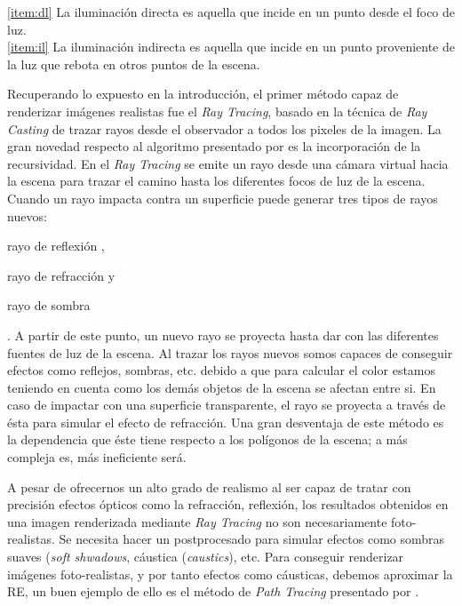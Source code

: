 \documentclass[titlepage,12pt]{article}
\begin{document}
\ref{item:dl} La iluminación directa es aquella que incide en un punto desde el foco de luz. \\
\ref{item:il} La iluminación indirecta es aquella que incide en un punto proveniente de la luz que rebota en otros puntos de la escena.

Recuperando lo expuesto en la introducción, el primer método capaz de renderizar imágenes realistas fue el \textit{Ray Tracing}, basado en la técnica de \textit{Ray Casting} de trazar rayos desde el observador a todos los pixeles de la imagen. La gran novedad respecto al algoritmo presentado por \citep{Appel1968} es la incorporación de la recursividad. En el \textit{Ray Tracing} se emite un rayo desde una cámara virtual hacia la escena para trazar el camino hasta los diferentes focos de luz de la escena. Cuando un rayo impacta contra un superficie puede generar tres tipos de rayos nuevos: \begin{enumerate*}[label=\roman*)] \item rayo de reflexión \label{ray:reflected}, \item rayo de refracción y \item rayo de sombra \end{enumerate*}. A partir de este punto, un nuevo rayo se proyecta hasta dar con las diferentes fuentes de luz de la escena. Al trazar los rayos nuevos somos capaces de conseguir efectos como reflejos, sombras, etc. debido a que para calcular el color estamos teniendo en cuenta como los demás objetos de la escena se afectan entre si. En caso de impactar con una superficie transparente, el rayo se proyecta a través de ésta para simular el efecto de refracción. Una gran desventaja de este método es la dependencia que éste tiene respecto a los polígonos de la escena; a más compleja es, más ineficiente será. 

A pesar de ofrecernos un alto grado de realismo al ser capaz de tratar con precisión efectos ópticos como la refracción, reflexión, los resultados obtenidos en una imagen renderizada mediante \textit{Ray Tracing} no son necesariamente foto-realistas. Se necesita hacer un postprocesado para simular efectos como sombras suaves (\textit{soft shwadows}, cáustica (\textit{caustics}), etc. Para conseguir renderizar imágenes foto-realistas, y por tanto efectos como cáusticas, debemos aproximar la RE, un buen ejemplo de ello es el método de \textit{Path Tracing} presentado por \citep{Kajiya1986}.
\end{document}
